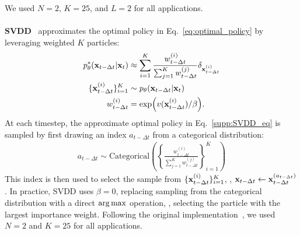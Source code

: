 We used $N=2$, $K=25$, and $L=2$ for all applications. 
\\
\\
% 
% 
\textbf{SVDD}~\cite{Li2024:SVDD} approximates the optimal policy in Eq.~\ref{eq:optimal_policy} by leveraging weighted $K$ particles:
\begin{align}
    \label{supp:SVDD_eq}
    p^{*}_\theta(\mathbf{x}_{t-\Delta t} | \mathbf{x}_{t}) &\approx \sum_{i=1}^K  \frac{w^{(i)}_{t-\Delta t}}{\sum_{j=1}^K w^{(j)}_{t-\Delta t}} \delta_{\mathbf{x}^{(i)}_{t-\Delta t}} \\
    \nonumber
    \{ \mathbf{x}^{(i)}_{t-\Delta t} \}_{i=1}^{K} & \sim p_\theta(\mathbf{x}_{t-\Delta t} | \mathbf{x}_{t})\\
    \nonumber
    w^{(i)}_{t-\Delta t} &= \exp( v ( \mathbf{x}^{(i)}_{t-\Delta t} ) / \beta ).
\end{align}
At each timestep, the approximate optimal policy in Eq.~\ref{supp:SVDD_eq} is sampled by first drawing an index $a_{t-\Delta t}$ from a categorical distribution:
\begin{align}
    a_{t-\Delta t} \sim \text{Categorical}\left(\left\{ \frac{w^{(i)}_{t-\Delta t}}{\sum_{j=1}^K w^{(j)}_{t-\Delta t}} \right\}_{i=1}^{K}\right)
\end{align}
This index is then used to select the sample from $\{ \mathbf{x}^{(i)}_{t-\Delta t} \}_{i=1}^{K}$, \ie, $\mathbf{x}_{t-\Delta t}\leftarrow \mathbf{x}_{t-\Delta t}^{(a_{t-\Delta t})}$.
In practice, SVDD uses $\beta=0$, replacing sampling from the categorical distribution with a direct $\operatorname*{arg\,max}$ operation, \ie, selecting the particle with the largest importance weight.
Following the original implementation~\cite{Li2024:SVDD}, we used $N=2$ and $K=25$ for all applications. 
